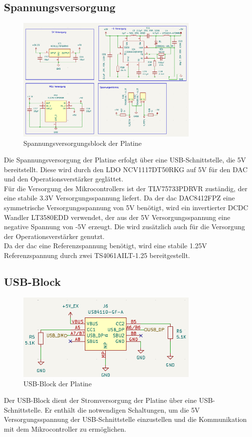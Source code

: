 \subsection{Spannungsversorgung}
\begin{figure}[H]
    \centering
    \includegraphics[width=0.8\textwidth]{bilder/Bipolar_Power.png}
    \caption{Spannungsversorgungsblock der Platine}
    \label{fig:spannungsversorgung}
\end{figure}
Die Spannungsversorgung der Platine erfolgt über eine USB-Schnittstelle, die 5V bereitstellt. 
Diese wird durch den LDO NCV1117DT50RKG auf 5V für den DAC und den Operationsverstärker geglättet.\\
Für die Versorgung des Mikrocontrollers ist der TLV75733PDRVR zuständig, der eine stabile 3.3V Versorgungsspannung liefert.
Da der \gls{dac} DAC8412FPZ eine symmetrische Versorgungsspannung von \pm 5V benötigt, wird ein invertierter DCDC Wandler LT3580EDD verwendet, der aus der 5V Versorgungsspannung eine negative Spannung von -5V erzeugt. Die wird zusätzlich auch für die Versorgung der Operationsverstärker genutzt.\\
Da der \gls{dac} eine Referenzspannung benötigt, wird eine stabile \pm 1.25V Referenzspannung durch zwei TS4061AILT-1.25 bereitgestellt. 

\subsection{USB-Block}
\begin{figure}[H]
    \centering
    \includegraphics[width=0.8\textwidth]{bilder/USBC_Port.png}
    \caption{USB-Block der Platine}
    \label{fig:usb_block}
\end{figure}
Der USB-Block dient der Stromversorgung der Platine über eine USB-Schnittstelle. Er enthält die notwendigen Schaltungen, um die 5V Versorgungsspannung der USB-Schnittstelle einzustellen und die Kommunikation mit dem Mikrocontroller zu ermöglichen.\\